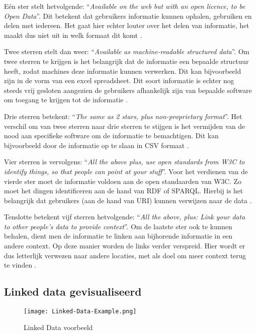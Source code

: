 Eén ster stelt hetvolgende: ``\textit{Available on the web but with an open licence, to be Open Data}''. Dit betekent dat gebruikers informatie kunnen ophalen, gebruiken en delen met iedereen. Het gaat hier echter louter over het delen van informatie, het maakt dus niet uit in welk formaat dit komt \cite{berners2006linkeddata}. 

Twee sterren stelt dan weer: ``\textit{Available as machine-readable structured data}''. Om twee sterren te krijgen is het belangrijk dat de informatie een bepaalde structuur heeft, zodat machines deze informatie kunnen verwerken. Dit kan bijvoorbeeld zijn in de vorm van een excel spreadsheet. Dit soort informatie is echter nog steeds vrij gesloten aangezien de gebruikers afhankelijk zijn van bepaalde software om toegang te krijgen tot de informatie \cite{berners2006linkeddata}.

Drie sterren betekent: ``\textit{The same as 2 stars, plus non-proprietary format}''. Het verschil om van twee sterren naar drie sterren te stijgen is het vermijden van de nood aan specifieke software om de informatie te bemachtigen. Dit kan bijvoorbeeld door de informatie op te slaan in CSV formaat \cite{berners2006linkeddata}.

Vier sterren is vervolgens: ``\textit{All the above plus, use open standards from W3C to identify things, so that people can point at your stuff}''. Voor het verdienen van de vierde ster moet de informatie voldoen aan de open standaarden van W3C. Zo moet het dingen identificeren aan de hand van RDF of SPARQL. Hierbij is het belangrijk dat gebruikers (aan de hand van URI) kunnen verwijzen naar de data \cite{berners2006linkeddata}.

Tenslotte betekent vijf sterren hetvolgende: ``\textit{All the above, plus: Link your data to other people’s data to provide context}''. Om de laatste ster ook te kunnen behalen, dient men de informatie te linken aan bijhorende informatie in een andere context. Op deze manier worden de links verder verspreid. Hier wordt er dus letterlijk verwezen naar andere locaties, met als doel om meer context terug te vinden \cite{berners2006linkeddata}.

\subsection{Linked data gevisualiseerd}

\begin{figure}[ht!]
    \centering
    \texttt{[image: Linked-Data-Example.png]}
    \caption{Linked Data voorbeeld}
    \label{fig:linked_data_example}
\end{figure}

